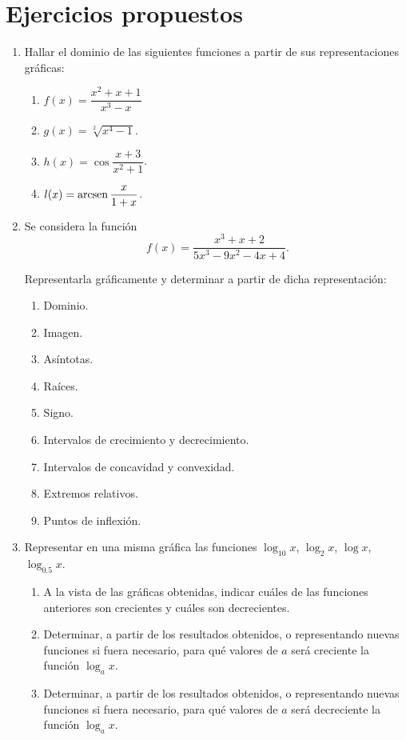\section{Ejercicios propuestos}
\begin{enumerate}[leftmargin=*]
\item Hallar el dominio de las siguientes funciones a partir de sus representaciones gráficas:

      \begin{enumerate}
      \item $f(x)=\dfrac{x^{2} + x + 1}{x^{3} - x}$
      \item $g(x)=\sqrt[2]{x^{4}-1}$.
      \item $h(x)=\cos{\dfrac{x + 3}{x^{2} + 1}}$.
      \item $l(x)=\operatorname{arcsen}{\dfrac{x}{1+x}}$.
      \end{enumerate}

\item Se considera la función
      \[
      \ f(x)=\frac{x^{3} + x +2}{5x^{3} - 9x^{2} - 4x + 4}.
      \]

      Representarla gráficamente y determinar a partir de dicha representación:

      \begin{enumerate}
      \item Dominio.
      \item Imagen.
      \item Asíntotas.
      \item Raíces.
      \item Signo.
      \item Intervalos de crecimiento y decrecimiento.
      \item Intervalos de concavidad y convexidad.
      \item Extremos relativos.
      \item Puntos de inflexión.
      \end{enumerate}

\item Representar en una misma gráfica las funciones $\log_{10}{x}$, $\log_{2}{x}$, $\log{x}$, $\log_{0.5}{x}$.
      \begin{enumerate}
      \item A la vista de las gráficas obtenidas, indicar cuáles de las funciones anteriores son crecientes y cuáles son decrecientes.
      \item Determinar, a partir de los resultados obtenidos, o representando nuevas funciones si fuera necesario, para qué valores de $a$ será
            creciente la función $\log_{a}{x}$.
      \item Determinar, a partir de los resultados obtenidos, o representando nuevas funciones si fuera necesario, para qué valores de $a$ será
            decreciente la función $\log_{a}{x}$.
      \end{enumerate}


\end{enumerate}
